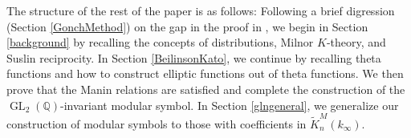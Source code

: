 \documentclass[12pt,amstex,amssymb]{article}
\theoremstyle{plain}
\theoremstyle{definition}
\def\lra{\longrightarrow}
\def\cR{{\cal R}}
\def\cS{{\cal S}}
\def\Z{{\mathbb Z}}
\def\A{{\mathbb A}}
\def\Q{{\mathbb Q}}
\newcommand{\GL}{\operatorname{GL}}
\newcommand{\ba}{\mathbf{a}}
\begin{document}
%
%
%



\vspace{1em}
The structure of the rest of the paper is as follows: 
Following a brief digression (Section \ref{GonchMethod}) on the gap in the proof in \cite{Gon}, we begin in Section \ref{background} by recalling the concepts of distributions, Milnor $K$-theory, and Suslin reciprocity.  In Section \ref{BeilinsonKato}, we continue by recalling theta functions and how to construct elliptic functions out of theta functions.  We then prove that the Manin relations are satisfied and complete the construction of the $\GL_2(\Q)$-invariant modular symbol.  In Section \ref{glngeneral}, we generalize our construction of modular symbols to those with coefficients in $\tilde K^M_n(k_\infty)$.  
\end{document}
